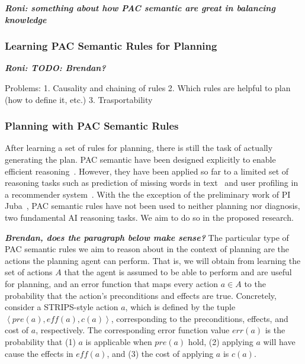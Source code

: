 \documentclass[12pt]{article}
\newcommand{\note}[1]{\textbf{\textit{#1}}}
\newcommand{\tuple}[1]{\ensuremath{\left \langle #1 \right \rangle }}
\newcommand{\eff}{\textit{eff}}
\newcommand{\pre}{\textit{pre}}
\begin{document}
\note{Roni: something about how PAC semantic are great in balancing knowledge}





\subsubsection{Learning PAC Semantic Rules for Planning}
\note{Roni: TODO: Brendan?}


Problems: 
1. Causality and chaining of rules
2. Which rules are helpful to plan (how to define it, etc.)
3. Trasportability

\subsubsection{Planning with PAC Semantic Rules}


After learning a set of rules for planning, there is still the task of actually generating the plan. PAC semantic have been designed explicitly to enable efficient reasoning~\cite{valiant2000robustLogics}. However, they have been applied so far to a limited set of reasoning tasks such as prediction of missing words in text~\cite{michael2008first} and user profiling in a recommender system~\cite{semeraro2009knowledge}. With the the exception of the preliminary work of PI Juba~\cite{juba2016aaai,juba2016jmlr}, PAC semantic rules have not been used to neither planning nor diagnosis, two fundamental AI reasoning tasks. We aim to do so in the proposed research. 


\note{Brendan, does the paragraph below make sense?}
The particular type of PAC semantic rules we aim to reason about in the context of planning are the actions the planning agent can perform. 
That is, we will obtain from learning the set of actions $A$ that the agent is assumed to be able to perform and are useful for planning, 
and an error function that maps every action $a\in A$ 
to the probability that the action's preconditions and effects are true.
Concretely, consider a STRIPS-style action $a$, which is defined by the tuple $\tuple{\pre(a), \eff(a), c(a)}$, corresponding to the preconditions, effects, and cost of $a$, respectively. The corresponding error function value $err(a)$ is the probability that (1) $a$ is applicable when $\pre(a)$ hold, (2) applying $a$ will have cause the effects in $\eff(a)$, and (3) the cost of applying $a$ is $c(a)$. 
\end{document}
